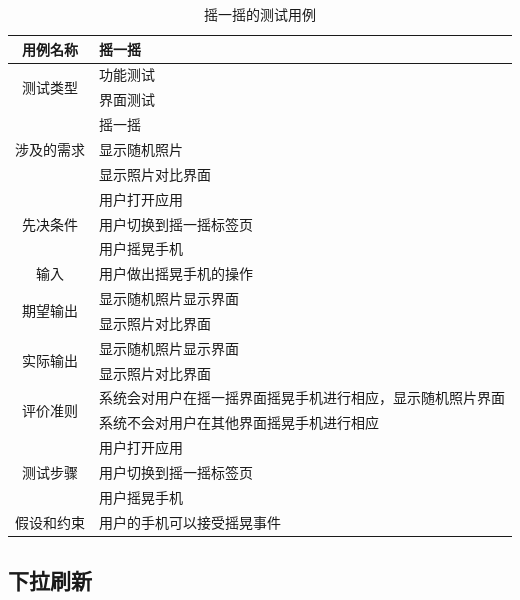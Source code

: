 \begin{table}
    \centering
    \caption{摇一摇的测试用例}
    \label{shake-device}
    \begin{tabular}{c|l}
        \hline
        用例名称    & 摇一摇       \\ \hline
        \multirow{2}{*}{测试类型}    & 功能测试     \\
                   & 界面测试     \\ \hline
        \multirow{3}{*}{涉及的需求}  & 摇一摇       \\
                                    & 显示随机照片  \\
                   & 显示照片对比界面 \\ \hline
        \multirow{3}{*}{先决条件}    & 用户打开应用    \\
                                    & 用户切换到摇一摇标签页 \\
                                    & 用户摇晃手机    \\ \hline
        输入                          & 用户做出摇晃手机的操作 \\ \hline
        \multirow{2}{*}{期望输出}    & 显示随机照片显示界面     \\
                                 & 显示照片对比界面   \\ \hline
        \multirow{2}{*}{实际输出}    & 显示随机照片显示界面 \\
                                    & 显示照片对比界面   \\ \hline
        \multirow{2}{*}{评价准则}   & 系统会对用户在摇一摇界面摇晃手机进行相应，显示随机照片界面 \\
                                   & 系统不会对用户在其他界面摇晃手机进行相应 \\ \hline
        \multirow{3}{*}{测试步骤}   & 用户打开应用    \\
                                   & 用户切换到摇一摇标签页 \\
                                   & 用户摇晃手机    \\ \hline
        假设和约束  & 用户的手机可以接受摇晃事件 \\ \hline
    \end{tabular}
\end{table}

\subsection{下拉刷新}

